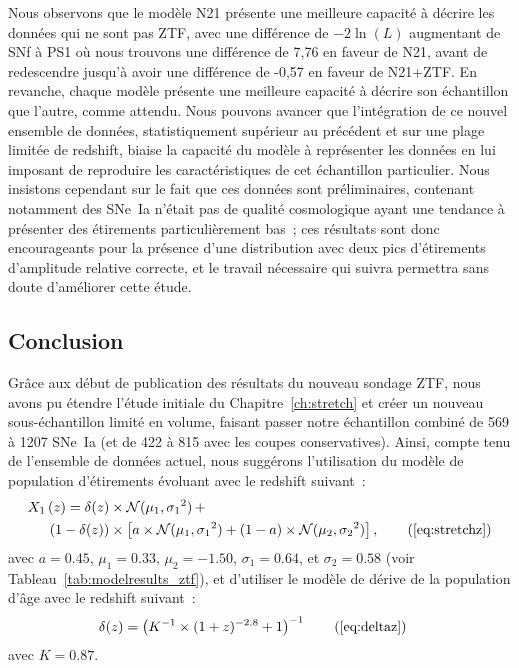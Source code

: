 \documentclass[../main/main.tex]{subfiles}
\begin{document}
Nous observons que le modèle N21 présente une meilleure capacité à décrire les
données qui ne sont pas ZTF, avec une différence de $-2\ln(L)$ augmentant de SNf
à PS1 où nous trouvons une différence de 7,76 en faveur de N21, avant de
redescendre jusqu'à avoir une différence de -0,57 en faveur de N21+ZTF. En
revanche, chaque modèle présente une meilleure capacité à décrire son
échantillon que l'autre, comme attendu. Nous pouvons avancer que l'intégration
de ce nouvel ensemble de données, statistiquement supérieur au précédent et sur
une plage limitée de redshift, biaise la capacité du modèle à représenter les
données en lui imposant de reproduire les caractéristiques de cet échantillon
particulier. Nous insistons cependant sur le fait que ces données sont
préliminaires, contenant notamment des SNe~Ia n'était pas de qualité
cosmologique ayant une tendance à présenter des étirements particulièrement
bas~; ces résultats sont donc encourageants pour la présence d'une distribution
avec deux pics d'étirements d'amplitude relative correcte, et le travail
nécessaire qui suivra permettra sans doute d'améliorer cette étude.

\subsection{Conclusion}\label{ssec:ztfconc}

Grâce aux début de publication des résultats du nouveau sondage ZTF, nous avons
pu étendre l'étude initiale du Chapitre~\ref{ch:stretch} et créer un nouveau
sous-échantillon limité en volume, faisant passer notre échantillon combiné de
569 à 1207 SNe~Ia (et de 422 à 815 avec les coupes conservatives). Ainsi, compte
tenu de l'ensemble de données actuel, nous suggérons l'utilisation du modèle de
population d'étirements évoluant avec le redshift suivant~:
\begin{align*}\label{eqconclusion:stretchz}
    X_1\left(z \right) =
        \delta(z)&\times\mathcal{N}(\mu_1,\sigma_1{}^2)\,+\nonumber\\
        (1-\delta(z))&\times \left[a\times\mathcal{N}(\mu_1,\sigma_1{}^2) +
        (1-a)\times\mathcal{N}(\mu_2,\sigma_2{}^2)\right],
    \tag{\ref{eq:stretchz}}
\end{align*}
avec $a=0.45$, $\mu_1=0.33$, $\mu_2=-1.50$, $\sigma_1=0.64$, et $\sigma_2=0.58$
(voir Tableau~\ref{tab:modelresults_ztf}), et d'utiliser le modèle de dérive
de la population d'âge avec le redshift suivant~:
\begin{align*}
    \delta(z) & = \left( K^{-1} \times (1+z)^{-2.8} +1 \right)^{-1}
    \tag{\ref{eq:deltaz}}
\end{align*}
avec $K=0.87$.
\end{document}
